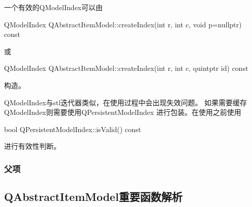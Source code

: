 一个有效的QModelIndex可以由\begin{littlelongworld}
QModelIndex QAbstractItemModel::createIndex(int r, int c, void \raisebox{-0.35ex}{\sourcefonttwo{}*}p{\sourcefonttwo{}=}nullptr) const
\end{littlelongworld}
或\begin{littlelongworld}
QModelIndex QAbstractItemModel::createIndex(int r, int c, quintptr id) const
\end{littlelongworld}
构造。

QModelIndex与stl迭代器类似，在使用过程中会出现失效问题。
如果需要缓存QModelIndex则需要使用QPersistentModelIndex
进行包装。在使用之前使用\begin{littlelongworld}
bool QPersistentModelIndex::isValid() const
\end{littlelongworld}
进行有效性判断。


\FloatBarrier
\subsubsection{
父项
}\label{c000019s01s03s03}


\FloatBarrier
\subsection{
QAbstractItemModel重要函数解析
}\label{c000019s01s02}

